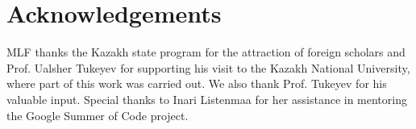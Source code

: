 \documentclass[11pt]{article}
\begin{document}
\section*{Acknowledgements}

MLF thanks the Kazakh state program for the attraction of foreign scholars and Prof. Ualsher Tukeyev for supporting his visit to the Kazakh National University, where part of this work was carried out. We also thank Prof. Tukeyev for his valuable input. Special thanks to Inari Listenmaa for her assistance in mentoring the Google Summer of Code project. 



\end{document}
